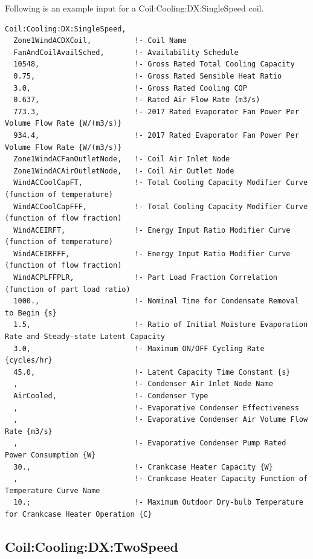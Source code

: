 Following is an example input for a Coil:Cooling:DX:SingleSpeed coil.

\begin{lstlisting}
Coil:Cooling:DX:SingleSpeed,
  Zone1WindACDXCoil,          !- Coil Name
  FanAndCoilAvailSched,       !- Availability Schedule
  10548,                      !- Gross Rated Total Cooling Capacity
  0.75,                       !- Gross Rated Sensible Heat Ratio
  3.0,                        !- Gross Rated Cooling COP
  0.637,                      !- Rated Air Flow Rate (m3/s)
  773.3,                      !- 2017 Rated Evaporator Fan Power Per Volume Flow Rate {W/(m3/s)}
  934.4,                      !- 2017 Rated Evaporator Fan Power Per Volume Flow Rate {W/(m3/s)}
  Zone1WindACFanOutletNode,   !- Coil Air Inlet Node
  Zone1WindACAirOutletNode,   !- Coil Air Outlet Node
  WindACCoolCapFT,            !- Total Cooling Capacity Modifier Curve (function of temperature)
  WindACCoolCapFFF,           !- Total Cooling Capacity Modifier Curve (function of flow fraction)
  WindACEIRFT,                !- Energy Input Ratio Modifier Curve (function of temperature)
  WindACEIRFFF,               !- Energy Input Ratio Modifier Curve (function of flow fraction)
  WindACPLFFPLR,              !- Part Load Fraction Correlation (function of part load ratio)
  1000.,                      !- Nominal Time for Condensate Removal to Begin {s}
  1.5,                        !- Ratio of Initial Moisture Evaporation Rate and Steady-state Latent Capacity
  3.0,                        !- Maximum ON/OFF Cycling Rate {cycles/hr}
  45.0,                       !- Latent Capacity Time Constant {s}
  ,                           !- Condenser Air Inlet Node Name
  AirCooled,                  !- Condenser Type
  ,                           !- Evaporative Condenser Effectiveness
  ,                           !- Evaporative Condenser Air Volume Flow Rate {m3/s}
  ,                           !- Evaporative Condenser Pump Rated Power Consumption {W}
  30.,                        !- Crankcase Heater Capacity {W}
  ,                           !- Crankcase Heater Capacity Function of Temperature Curve Name
  10.;                        !- Maximum Outdoor Dry-bulb Temperature for Crankcase Heater Operation {C}
\end{lstlisting}

\subsection{Coil:Cooling:DX:TwoSpeed}\label{coilcoolingdxtwospeed}

